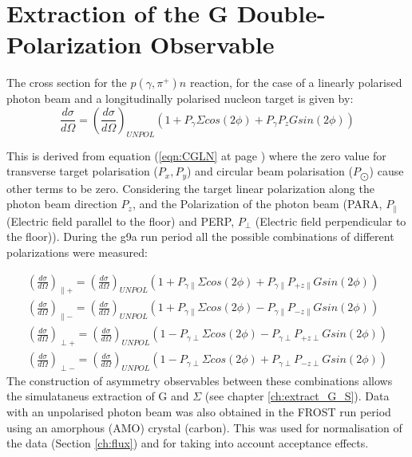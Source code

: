 \section{Extraction of the G Double-Polarization Observable} \label{ch:extract_G}
The cross section for the $p(\gamma,\pi^+)n$ reaction, for the case of a linearly polarised photon beam and a longitudinally polarised nucleon target is given by:
\begin{equation}
  \frac{d\sigma}{d\Omega} = \left(\frac{d\sigma}{d\Omega}\right)_{UNPOL}  \left( 1 + P_{\gamma}\Sigma cos(2\phi) + P_{\gamma} P_z G sin(2\phi) \right)
  \label{eqn:extract_G_S}
\end{equation}

This is derived from equation (\ref{eqn:CGLN} at page \pageref{eqn:CGLN}) where the zero value for transverse target polarisation ($P_x , P_y$) and circular beam polarisation ($P_{\bigodot}$) cause other terms to be zero. Considering the target linear polarization along the photon beam direction $P_z$, and the Polarization of the photon beam (PARA, $P_{\parallel}$ (Electric field parallel to the floor) and PERP, $P_{\perp}$ (Electric field perpendicular to the floor)).
During the g9a run period all the possible combinations of different polarizations were measured:

\begin{eqnarray}
\left(\frac{d\sigma}{d\Omega}\right)_{\parallel +} = \left(\frac{d\sigma}{d\Omega}\right)_{UNPOL}  \left( 1 + P_{\gamma \parallel}\Sigma cos(2\phi) + P_{\gamma \parallel} P_{+z\parallel} G sin(2\phi) \right) \\
\left(\frac{d\sigma}{d\Omega}\right)_{\parallel -} = \left(\frac{d\sigma}{d\Omega}\right)_{UNPOL}  \left( 1 + P_{\gamma \parallel}\Sigma cos(2\phi) - P_{\gamma \parallel} P_{-z\parallel} G sin(2\phi) \right) \\
\left(\frac{d\sigma}{d\Omega}\right)_{\perp +} = \left(\frac{d\sigma}{d\Omega}\right)_{UNPOL}  \left( 1 - P_{\gamma \perp}\Sigma cos(2\phi) - P_{\gamma \perp} P_{+z\perp} G sin(2\phi) \right) \\
\left(\frac{d\sigma}{d\Omega}\right)_{\perp -} = \left(\frac{d\sigma}{d\Omega}\right)_{UNPOL}  \left( 1 - P_{\gamma \perp}\Sigma cos(2\phi) + P_{\gamma \perp} P_{-z\perp} G sin(2\phi) \right)
\end{eqnarray}
The construction of asymmetry observables between these combinations allows the simulataneus extraction of G and $\Sigma$ (see chapter \ref{ch:extract_G_S}). Data with an unpolarised photon beam was also obtained in the FROST run period using an amorphous (AMO) crystal (carbon). This was used for normalisation of the data (Section \ref{ch:flux}) and for taking into account acceptance effects. 

